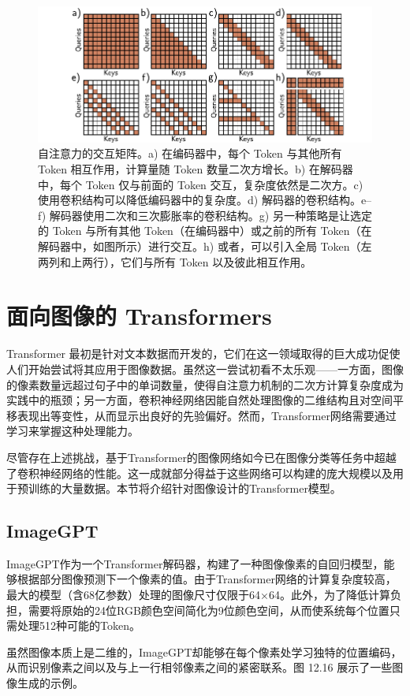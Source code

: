 \documentclass[lang=cn,newtx,10pt,scheme=chinese]{elegantbook}
\begin{document}
\begin{figure}[ht!]
\centering
\includegraphics[width=0.7\linewidth]{PDFFigures/UDLChap12PDF/TransformerLongRange.pdf}
\caption{自注意力的交互矩阵。a) 在编码器中，每个 Token 与其他所有 Token 相互作用，计算量随 Token 数量二次方增长。b) 在解码器中，每个 Token 仅与前面的 Token 交互，复杂度依然是二次方。c) 使用卷积结构可以降低编码器中的复杂度。d) 解码器的卷积结构。e–f) 解码器使用二次和三次膨胀率的卷积结构。g) 另一种策略是让选定的 Token 与所有其他 Token（在编码器中）或之前的所有 Token（在解码器中，如图所示）进行交互。h) 或者，可以引入全局 Token（左两列和上两行），它们与所有 Token 以及彼此相互作用。}
\end{figure}

\section{面向图像的 Transformers}
Transformer 最初是针对文本数据而开发的，它们在这一领域取得的巨大成功促使人们开始尝试将其应用于图像数据。虽然这一尝试初看不太乐观——一方面，图像的像素数量远超过句子中的单词数量，使得自注意力机制的二次方计算复杂度成为实践中的瓶颈；另一方面，卷积神经网络因能自然处理图像的二维结构且对空间平移表现出等变性，从而显示出良好的先验偏好。然而，Transformer网络需要通过学习来掌握这种处理能力。

尽管存在上述挑战，基于Transformer的图像网络如今已在图像分类等任务中超越了卷积神经网络的性能。这一成就部分得益于这些网络可以构建的庞大规模以及用于预训练的大量数据。本节将介绍针对图像设计的Transformer模型。

\subsection{ImageGPT}
ImageGPT作为一个Transformer解码器，构建了一种图像像素的自回归模型，能够根据部分图像预测下一个像素的值。由于Transformer网络的计算复杂度较高，最大的模型（含68亿参数）处理的图像尺寸仅限于64×64。此外，为了降低计算负担，需要将原始的24位RGB颜色空间简化为9位颜色空间，从而使系统每个位置只需处理512种可能的Token。

虽然图像本质上是二维的，ImageGPT却能够在每个像素处学习独特的位置编码，从而识别像素之间以及与上一行相邻像素之间的紧密联系。图 12.16 展示了一些图像生成的示例。
\end{document}
